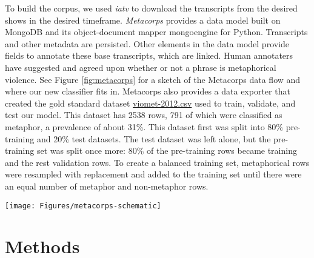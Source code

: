 \documentclass[11pt,letterpaper]{amsart}
\begin{document}
To build the corpus, we used \textit{iatv} to download the transcripts from
the desired shows in the desired timeframe. \textit{Metacorps} provides 
a data model built on MongoDB and its object-document mapper mongoengine for
Python. Transcripts and other metadata are persisted. Other elements in the
data model provide fields to annotate these base transcripts, which are
linked. Human annotaters have suggested and agreed upon whether or not a
phrase is metaphorical violence. See Figure \ref{fig:metacorps} for a
sketch of the Metacorps data flow and where our new classifier fits in.
Metacorps also provides a data exporter that
created the gold standard dataset 
\href{http://metacorps.io/static/data/viomet-2012.csv}{viomet-2012.csv} used
to train, validate, and test our model. This dataset has 2538 rows, 791 of 
which were classified as metaphor, a prevalence of about 31\%. This dataset
first was split into 80\% pre-training and 20\% test datasets. The test dataset
was left alone, but the pre-training set was split once more: 80\% of the
pre-training rows became training and the rest validation rows. To create a 
balanced training set, metaphorical rows were resampled with replacement and
added to the training set until there were an equal number of metaphor and
non-metaphor rows. 

\begin{figure*}[t]
  \caption{Schematic of Metacorps: the annotation tool-set that connects 
    cable news transcripts to annotators, annotations to meaningful data tables, 
    and soon annotations and analyses to our neural network classifier.}
  \centering
  \texttt{[image: Figures/metacorps-schematic]}
\label{fig:metacorps}
\end{figure*}


\section{Methods}\label{methods}
\end{document}
